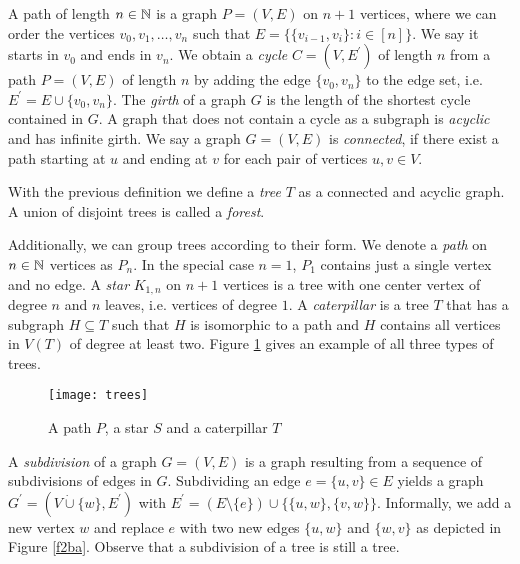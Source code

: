 A path of length $n\in\mathbb{N}$ is a graph $P=(V,E)$ on $n+1$ vertices, where we can order the vertices $v_0, v_1, \dots ,v_n$ such that $E=\lbrace\lbrace v_{i-1},v_i\rbrace : i\in [n]\rbrace$. We say it starts in $v_0$ and ends in $v_n$. We obtain a \textit{cycle} $C=(V,E^\prime)$ of length $n$ from a path $P=(V,E)$ of length $n$ by adding the edge $\lbrace v_0,v_n\rbrace$ to the edge set, i.e. $E^\prime = E\cup\lbrace v_0,v_n\rbrace$. The \textit{girth} of a graph $G$ is the length of the shortest cycle contained in $G$. A graph that does not contain a cycle as a subgraph is \textit{acyclic} and has infinite girth. We say a graph $G=(V,E)$ is \textit{connected}, if there exist a path starting at $u$ and ending at $v$ for each pair of vertices $u,v\in V$.

With the previous definition we define a \textit{tree} $T$ as a connected and acyclic graph. A union of disjoint trees is called a \textit{forest}.

Additionally, we can group trees according to their form. We denote a \textit{path} on $n\in\mathbb{N}$ vertices as $P_n$. In the special case $n=1$, $P_1$ contains just a single vertex and no edge. A \textit{star} $K_{1,n}$ on $n+1$ vertices is a tree with one center vertex of degree $n$ and $n$ leaves, i.e. vertices of degree $1$. A \textit{caterpillar} is a tree $T$ that has a subgraph $H\subseteq T$ such that $H$ is isomorphic to a path and $H$ contains all vertices in $V(T)$ of degree at least two.  %
Figure \ref{f3ba} gives an example of all three types of trees.

\begin{figure}[ht]
\begin{center}
\texttt{[image: trees]}
\end{center}
\caption{A path $P$, a star $S$ and a caterpillar $T$}
\label{f3ba}
\end{figure}

A \textit{subdivision} of a graph $G=(V,E)$ is a graph resulting from a sequence of subdivisions of edges in $G$. Subdividing an edge $e=\lbrace u,v\rbrace\in E$ yields a graph $G^\prime =(V\dot{\cup} \lbrace w\rbrace, E^\prime )$ with $E^\prime =(E\setminus \lbrace e\rbrace ) \cup \lbrace \lbrace u,w\rbrace, \lbrace v,w \rbrace\rbrace$. Informally, we add a new vertex $w$ and replace $e$ with two new edges $\lbrace u,w\rbrace$ and $\lbrace w,v\rbrace$ as depicted in Figure \ref{f2ba}. Observe that a subdivision of a tree is still a tree.\\

